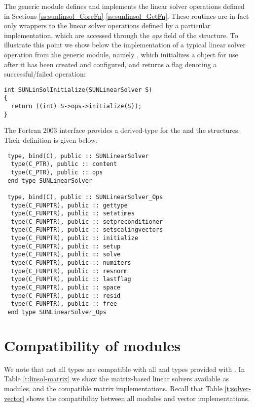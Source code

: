 The generic {\sunlinsol} module defines and implements the linear
solver operations defined in Sections
\ref{ss:sunlinsol_CoreFn}-\ref{ss:sunlinsol_GetFn}.  These routines
are in fact only wrappers to the linear solver operations
defined by a particular {\sunlinsol} implementation, which are
accessed through the {\em ops} field of the 
structure. To illustrate this point we show below the implementation
of a typical linear solver operation from the generic {\sunlinsol}
module, namely , which initializes a
{\sunlinsol} object for use after it has been created and configured,
and returns a flag denoting a successful/failed operation:
\begin{verbatim}
int SUNLinSolInitialize(SUNLinearSolver S)
{
  return ((int) S->ops->initialize(S));
}
\end{verbatim}

The Fortran 2003 interface provides a  derived-type for the
 and the  structures.
Their definition is given below.
\begin{verbatim}
 type, bind(C), public :: SUNLinearSolver
  type(C_PTR), public :: content
  type(C_PTR), public :: ops
 end type SUNLinearSolver

 type, bind(C), public :: SUNLinearSolver_Ops
  type(C_FUNPTR), public :: gettype
  type(C_FUNPTR), public :: setatimes
  type(C_FUNPTR), public :: setpreconditioner
  type(C_FUNPTR), public :: setscalingvectors
  type(C_FUNPTR), public :: initialize
  type(C_FUNPTR), public :: setup
  type(C_FUNPTR), public :: solve
  type(C_FUNPTR), public :: numiters
  type(C_FUNPTR), public :: resnorm
  type(C_FUNPTR), public :: lastflag
  type(C_FUNPTR), public :: space
  type(C_FUNPTR), public :: resid
  type(C_FUNPTR), public :: free
 end type SUNLinearSolver_Ops
\end{verbatim}


\section{Compatibility of  modules}\label{ss:sunlinsol_compatibility}

We note that not all {\sunlinsol} types are compatible with all
{\sunmatrix} and {\nvector} types provided with {\sundials}.  In Table
\ref{t:linsol-matrix} we show the matrix-based linear solvers
available as {\sunlinsol} modules, and the compatible matrix
implementations.  Recall that Table \ref{t:solver-vector} shows the
compatibility between all {\sunlinsol} modules and vector
implementations.

